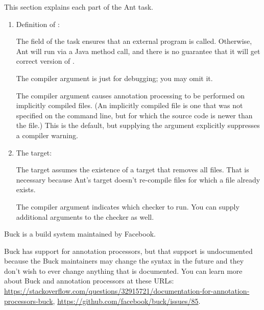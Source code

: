 
This section explains each part of the Ant task.

\begin{enumerate}
\item Definition of :

The  field of the  task
ensures that an external  program is called.  Otherwise, Ant will run
 via a Java method call, and there is no guarantee that it will get
correct version of .

The  compiler argument is just for debugging; you may omit
it.

The  compiler argument causes annotation processing
to be performed on implicitly compiled files.  (An implicitly compiled file
is one that was not specified on the command line, but for which the source
code is newer than the  file.)  This is the default, but
supplying the argument explicitly suppresses a compiler warning.


\item The  target:

The target assumes the existence of a  target that removes all
 files.  That is necessary because Ant's  target
doesn't re-compile  files for which a  file
already exists.

The  compiler argument indicates which checker to
run.  You can supply additional arguments to the checker as well.

\end{enumerate}



Buck is a build system maintained by Facebook.

Buck has support for annotation processors, but that support is
undocumented because the Buck maintainers may change the syntax in the
future and they don't wish to ever change anything that is documented.
You can learn more about Buck and annotation processors at these URLs:
{\codesize\url{https://stackoverflow.com/questions/32915721/documentation-for-annotation-processors-buck}},
{\codesize\url{https://github.com/facebook/buck/issues/85}}.

